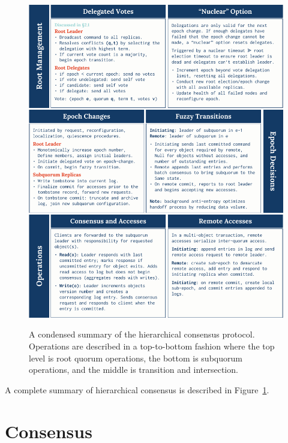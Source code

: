 \begin{figure}
    \begin{center}
        \includegraphics[width=5in]{figures/ch03_hc_operation_summary.pdf}
    \end{center}
    \renewcommand{\baselinestretch}{1}
    \small\normalsize

    \begin{quote}
        \caption[HC Operational Summary]{A condensed summary of the hierarchical consensus protocol. Operations are described in a top-to-bottom fashion where the top level is root quorum operations, the bottom is subquorum operations, and the middle is transition and intersection.}
        \label{fig:ch03_hc_operation_summary}
    \end{quote}
\end{figure}
\renewcommand{\baselinestretch}{2}
\small\normalsize

A complete summary of hierarchical consensus is described in Figure~\ref{fig:ch03_hc_operation_summary}.

\section{Consensus}

